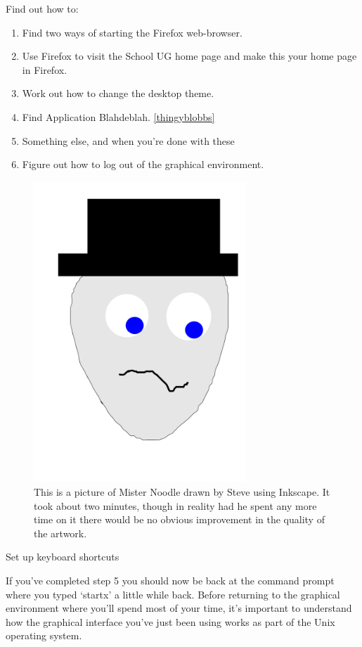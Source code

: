 Find out how to:
\begin{enumerate}
\item Find two ways of starting the Firefox web-browser.
\item Use Firefox to visit the School UG home page
   and make this your
  home page in Firefox.
\item Work out how to change the desktop theme. 
\item Find Application Blahdeblah. \ref{thingyblobbs}
\item Something else, and when you're done with these
\item Figure out how to log out of the graphical environment.
\end{enumerate}

\begin{figure}[t]
\centerline{\includegraphics[width=8cm]{images/mrnoodle}}
\caption{This is a picture of Mister Noodle drawn by Steve using Inkscape. It took about two minutes, though in reality had he spent any more time on it there would be no obvious improvement in the quality of the artwork.}\label{figure:mrnoodle}
\end{figure}


\begin{note}
Set up keyboard shortcuts
\end{note}

If you've completed step 5 you should now be back at the command prompt where you typed `startx' a little while back. Before returning to the graphical environment where you'll spend most of your time, it's important to understand how the graphical interface you've just been using works as part of the Unix operating system. 


